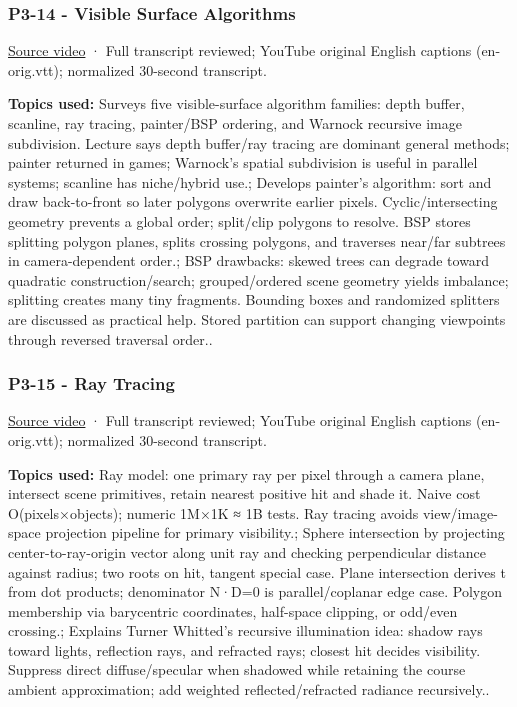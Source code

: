 \subsubsection{P3-14 - Visible Surface Algorithms}\label{04-visual-computing-ii-ch036-p3-14---visible-surface-algorithms}

\hypertarget{04-visual-computing-ii-ch036-p3-14---visible-surface-algorithms}{}

\href{https://www.youtube.com/watch?v=hmlWFi1TdbI}{Source video} · Full transcript reviewed; YouTube original English captions (en-orig.vtt); normalized 30-second transcript.

\textbf{Topics used:} Surveys five visible-surface algorithm families: depth buffer, scanline, ray tracing, painter/BSP ordering, and Warnock recursive image subdivision. Lecture says depth buffer/ray tracing are dominant general methods; painter returned in games; Warnock's spatial subdivision is useful in parallel systems; scanline has niche/hybrid use.; Develops painter's algorithm: sort and draw back-to-front so later polygons overwrite earlier pixels. Cyclic/intersecting geometry prevents a global order; split/clip polygons to resolve. BSP stores splitting polygon planes, splits crossing polygons, and traverses near/far subtrees in camera-dependent order.; BSP drawbacks: skewed trees can degrade toward quadratic construction/search; grouped/ordered scene geometry yields imbalance; splitting creates many tiny fragments. Bounding boxes and randomized splitters are discussed as practical help. Stored partition can support changing viewpoints through reversed traversal order..

\subsubsection{P3-15 - Ray Tracing}\label{04-visual-computing-ii-ch036-p3-15---ray-tracing}

\hypertarget{04-visual-computing-ii-ch036-p3-15---ray-tracing}{}

\href{https://www.youtube.com/watch?v=Ahp6LDQnK4Y}{Source video} · Full transcript reviewed; YouTube original English captions (en-orig.vtt); normalized 30-second transcript.

\textbf{Topics used:} Ray model: one primary ray per pixel through a camera plane, intersect scene primitives, retain nearest positive hit and shade it. Naive cost O(pixels×objects); numeric 1M×1K ≈ 1B tests. Ray tracing avoids view/image-space projection pipeline for primary visibility.; Sphere intersection by projecting center-to-ray-origin vector along unit ray and checking perpendicular distance against radius; two roots on hit, tangent special case. Plane intersection derives t from dot products; denominator N·D=0 is parallel/coplanar edge case. Polygon membership via barycentric coordinates, half-space clipping, or odd/even crossing.; Explains Turner Whitted's recursive illumination idea: shadow rays toward lights, reflection rays, and refracted rays; closest hit decides visibility. Suppress direct diffuse/specular when shadowed while retaining the course ambient approximation; add weighted reflected/refracted radiance recursively..

